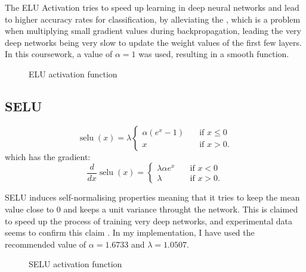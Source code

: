 \documentclass{article}
\DeclareMathOperator{\selu}{selu}
\begin{document}
The ELU Activation tries to speed up learning in deep neural networks and lead to higher accuracy rates for classification, by alleviating the  \citep{elu}, which is a problem when multiplying small gradient values during backpropagation, leading the very deep networks being very slow to update the weight values of the first few layers. In this coursework, a value of $\alpha = 1$ was used, resulting in a smooth function.

\begin{figure}[H]
    \centering
    \begin{subfigure}{}
      
    \end{subfigure}
    \begin{subfigure}{}
      
    \end{subfigure}
    \caption{ELU activation function}
\end{figure}


\subsection{SELU}\label{sec:selu}
\begin{equation}
  \selu(x) = \lambda
    \begin{cases}
     \alpha (e^{x} - 1) & \quad \text{if } x \leq  0 \\
     x          & \quad \text{if } x > 0 .
    \end{cases}
\end{equation} 
which has the gradient:
\begin{equation}
  \frac{d}{dx} \selu(x) =
     \begin{cases} 
      \lambda \alpha e^{x}  & \quad \text{if } x < 0 \\
      \lambda                   & \quad \text{if } x > 0 .
    \end{cases} 
\end{equation}

SELU induces self-normalising properties meaning that it tries to keep the mean value close to 0 and keeps a unit variance throught the network. This is claimed to speed up the process of training very deep networks, and experimental data seems to confirm this claim \citep{selu}. In my implementation, I have used the recommended value of $\alpha = 1.6733$ and $\lambda = 1.0507$.

\begin{figure}[H]
    \centering
    \begin{subfigure}{}
      
    \end{subfigure}
    \begin{subfigure}{}
      
    \end{subfigure}
    \caption{SELU activation function}
\end{figure}
\end{document}
